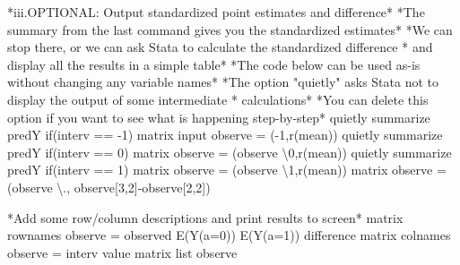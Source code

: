 \documentclass[
  10pt,
  a4paper,
]{book}
\newenvironment{Shaded}{\begin{snugshade}}{\end{snugshade}}
\newcommand{\FunctionTok}[1]{\textcolor[rgb]{0.28,0.35,0.67}{#1}}
\newcommand{\KeywordTok}[1]{\textcolor[rgb]{0.00,0.46,0.62}{#1}}
\newcommand{\NormalTok}[1]{\textcolor[rgb]{0.00,0.46,0.62}{#1}}
\newcommand{\OtherTok}[1]{\textcolor[rgb]{0.00,0.46,0.62}{#1}}
\newcommand{\StringTok}[1]{\textcolor[rgb]{0.13,0.47,0.30}{#1}}
\begin{document}
\begin{Shaded}
\begin{Highlighting}[]
\NormalTok{*iii.OPTIONAL: Output standardized point }\KeywordTok{estimates}\NormalTok{ and difference*}
\NormalTok{*The summary from the }\FunctionTok{last}\NormalTok{ command gives you the standardized }\KeywordTok{estimates}\NormalTok{*}
\NormalTok{*We can stop there, }\KeywordTok{or}\NormalTok{ we can ask Stata to calculate the standardized difference}
\NormalTok{* and }\KeywordTok{display} \OtherTok{all}\NormalTok{ the results }\KeywordTok{in}\NormalTok{ a simple }\KeywordTok{table}\NormalTok{*}
\NormalTok{*The code below can }\KeywordTok{be}\NormalTok{ used }\KeywordTok{as}\NormalTok{{-}is without changing any }\KeywordTok{variable}\NormalTok{ names*}
\NormalTok{*The option }\StringTok{"quietly"}\NormalTok{ asks Stata }\KeywordTok{not}\NormalTok{ to }\KeywordTok{display}\NormalTok{ the output }\KeywordTok{of}\NormalTok{ some intermediate}
\NormalTok{* calculations*}
\NormalTok{*You can }\KeywordTok{delete} \KeywordTok{this}\NormalTok{ option }\KeywordTok{if}\NormalTok{ you want to see what is happening step{-}}\KeywordTok{by}\NormalTok{{-}step*}
\KeywordTok{quietly} \KeywordTok{summarize}\NormalTok{ predY }\KeywordTok{if}\NormalTok{(interv == {-}1)}
\FunctionTok{matrix}\NormalTok{ input observe = ({-}1,}\OtherTok{\textasciigrave{}r(mean)\textquotesingle{}}\NormalTok{)}
\KeywordTok{quietly} \KeywordTok{summarize}\NormalTok{ predY }\KeywordTok{if}\NormalTok{(interv == 0)}
\FunctionTok{matrix}\NormalTok{ observe = (observe \textbackslash{}0,}\OtherTok{\textasciigrave{}r(mean)\textquotesingle{}}\NormalTok{)}
\KeywordTok{quietly} \KeywordTok{summarize}\NormalTok{ predY }\KeywordTok{if}\NormalTok{(interv == 1)}
\FunctionTok{matrix}\NormalTok{ observe = (observe \textbackslash{}1,}\OtherTok{\textasciigrave{}r(mean)\textquotesingle{}}\NormalTok{)}
\FunctionTok{matrix}\NormalTok{ observe = (observe \textbackslash{}., observe[3,2]{-}observe[2,2]) }

\NormalTok{*Add some }\OtherTok{row}\NormalTok{/column descriptions and }\KeywordTok{print}\NormalTok{ results to screen*}
\FunctionTok{matrix} \OtherTok{rownames}\NormalTok{ observe = observed E(Y(a=0)) E(Y(a=1)) difference}
\FunctionTok{matrix} \OtherTok{colnames}\NormalTok{ observe = interv }\OtherTok{value}
\FunctionTok{matrix} \OtherTok{list}\NormalTok{ observe }


\end{Highlighting}
\end{Shaded}
\end{document}
